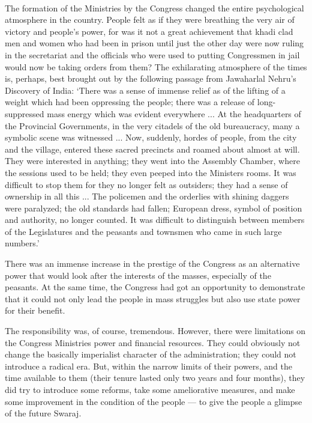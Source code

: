 \begin{multicols}{2}
\paragraph*{}
The formation of the Ministries by the Congress changed the entire psychological atmosphere in the country. People felt as if they were breathing the very air of victory and people's power, for was it not a great achievement that khadi clad men and women who had been in prison until just the other day were now ruling in the secretariat and the officials who were used to putting Congressmen in jail would now be taking orders from them? The exhilarating atmosphere of the times is, perhaps, best brought out by the following passage from Jawaharlal Nehru's Discovery of India: `There was a sense of immense relief as of the lifting of a weight which had been oppressing the people; there was a release of long-suppressed mass energy which was evident everywhere ... At the headquarters of the Provincial Governments, in the very citadels of the old bureaucracy, many a symbolic scene was witnessed ... Now, suddenly, hordes of people, from the city and the village, entered these sacred precincts and roamed about almost at will. They were interested in anything; they went into the Assembly Chamber, where the sessions used to be held; they even peeped into the Ministers rooms. It was difficult to stop them for they no longer felt as outsiders; they had a sense of ownership in all this ... The policemen and the orderlies with shining daggers were paralyzed; the old standards had fallen; European dress, symbol of position and authority, no longer counted. It was difficult to distinguish between members of the Legislatures and the peasants and townsmen who came in such large numbers.'

There was an immense increase in the prestige of the Congress as an alternative power that would look after the interests of the masses, especially of the peasants. At the same time, the Congress had got an opportunity to demonstrate that it could not only lead the people in mass struggles but also use state power for their benefit.

The responsibility was, of course, tremendous. However, there were limitations on the Congress Ministries power and financial resources. They could obviously not change the basically imperialist character of the administration; they could not introduce a radical era. But, within the narrow limits of their powers, and the time available to them (their tenure lasted only two years and four months), they did try to introduce some reforms, take some ameliorative measures, and make some improvement in the condition of the people --- to give the people a glimpse of the future Swaraj.


\end{multicols}
